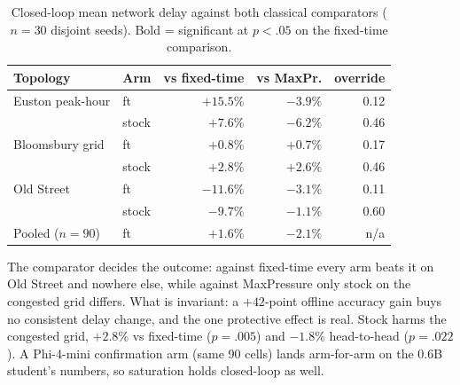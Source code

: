 \documentclass[conference]{IEEEtran}
\begin{document}
\begin{table}[t]
\caption{Closed-loop mean network delay against both classical
comparators ($n{=}30$ disjoint seeds). Bold = significant at $p<.05$ on
the fixed-time comparison.}
\label{tab:closedloop}
\centering
\small
\begin{tabular}{llrrr}
\toprule
Topology & Arm & vs fixed-time & vs MaxPr. & override \\
\midrule
Euston peak-hour & ft & $+15.5\%$ & $-3.9\%$ & 0.12 \\
                 & stock & $+7.6\%$ & $-6.2\%$ & 0.46 \\
Bloomsbury grid  & ft & $+0.8\%$ & $+0.7\%$ & 0.17 \\
                 & stock & $\mathbf{+2.8\%}$ & $+2.6\%$ & 0.46 \\
Old Street       & ft & $\mathbf{-11.6\%}$ & $-3.1\%$ & 0.11 \\
                 & stock & $\mathbf{-9.7\%}$ & $-1.1\%$ & 0.60 \\
\midrule
Pooled ($n{=}90$) & ft & $+1.6\%$ & $-2.1\%$ & n/a \\
\bottomrule
\end{tabular}
\end{table}

The comparator decides the outcome: against fixed-time every arm beats it
on Old Street and nowhere else, while against MaxPressure only stock on the
congested grid differs. What is invariant: a $+42$-point offline accuracy
gain buys no consistent delay change, and the one protective effect is
real. Stock harms the congested grid, $+2.8\%$ vs fixed-time
($p{=}.005$) and $-1.8\%$ head-to-head ($p{=}.022$).
A Phi-4-mini confirmation arm (same 90 cells) lands arm-for-arm on the
0.6B student's numbers, so saturation holds closed-loop as well.
\end{document}
